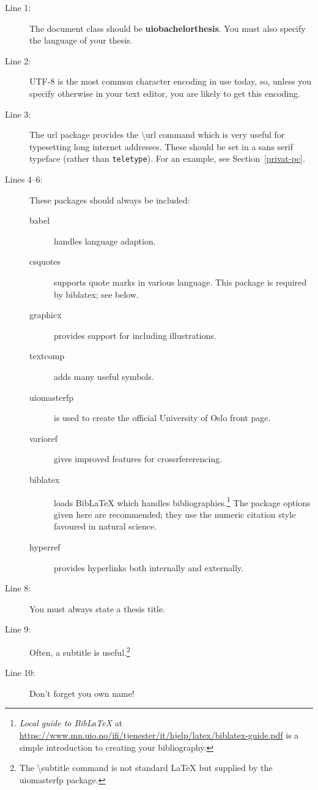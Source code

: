 \documentclass[UKenglish]{uiobachelorthesis}
\newcommand{\bsl}{\textbackslash}
\newcommand{\p}[1]{\textsf{#1}}
\newcommand{\pb}[1]{\textbf{\p{#1}}}
\newcommand{\pcmd}[1]{\p{\bsl #1}}
\begin{document}
\begin{description}
\item[Line 1:] The document class should be \pb{uiobachelorthesis}. You must
  also specify the language of your thesis.
\item[Line 2:] UTF-8 is the most common character encoding in use
  today, so, unless you specify otherwise in your text editor, you are
  likely to get this encoding.
\item[Line 3:] The \p{url} package provides the \pcmd{url}
  command which is very useful for typesetting long internet
  addresses. These should be set in a \textsf{sans serif} typeface
  (rather than \texttt{teletype}). For an example, see
  Section~\vref{privat-pc}.
\item[Lines 4--6:] These packages should always be included:
  \begin{description}
  \item[\p{babel}] handles language adaption.
  \item[\p{csquotes}] supports quote marks in various language. This
    package is required by \p{biblatex}; see below.
  \item[\p{graphicx}] provides support for including illustrations.
  \item[\p{textcomp}] adds many useful symbols.
  \item[\p{uiomasterfp}] is used to create the official University of
    Oslo front page.
  \item[\p{varioref}] gives improved features for crossrfererencing.
  \item[\p{biblatex}] loads Bib\LaTeX{} which handles
    bibliographies.\footnote{\emph{Local guide to Bib\LaTeX} at
      \url{https://www.mn.uio.no/ifi/tjenester/it/hjelp/latex/biblatex-guide.pdf}
      is a simple introduction to creating your bibliography.}
    The package options given here are recommended; they use the
    numeric citation style favoured in natural science.
  \item[\p{hyperref}] provides hyperlinks both internally and externally.
  \end{description}

\item[Line 8:] You must always state a thesis title.
\item[Line 9:] Often, a subtitle is useful.\footnote{The
  \pcmd{subtitle} command is not standard \LaTeX{} but supplied by the
  \p{uiomasterfp} package.}
\item[Line 10:] Don't forget you own name!


\end{description}
\end{document}
